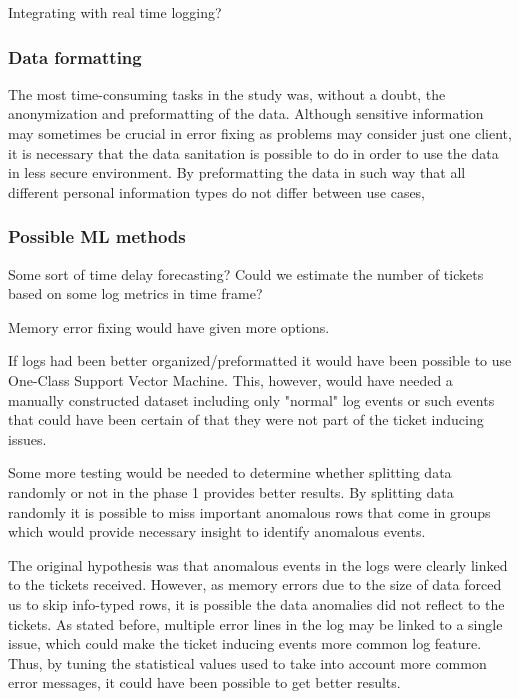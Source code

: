 
Integrating with real time logging?

\subsubsection*{Data formatting}
The most time-consuming tasks in the study was,
without a doubt,
the anonymization and preformatting of the data.
Although sensitive information may sometimes be crucial in error fixing
as problems may consider just one client,
it is necessary that the data sanitation is possible to do
in order to use the data in less secure environment.
By preformatting the data in such way
that all different personal information types
do not differ between use cases, %


\subsubsection*{Possible ML methods}
Some sort of time delay forecasting?\cite{erharter2021pointlessness}
Could we estimate the number of tickets
based on some log metrics in time frame?

Memory error fixing would have given more options.

If logs had been better organized/preformatted
it would have been possible to use One-Class Support Vector Machine.
This, however,
would have needed a manually constructed dataset
including only "normal" log events
or such events that could have been certain of
that they were not part of the ticket inducing issues.


Some more testing would be needed to determine
whether splitting data randomly or not in the phase 1
provides better results.
By splitting data randomly
it is possible to miss important anomalous rows that come in groups
which would provide necessary insight to identify anomalous events.

The original hypothesis was
that anomalous events in the logs
were clearly linked to the tickets received.
However,
as memory errors due to the size of data forced us to skip info-typed rows,
it is possible the data anomalies did not reflect to the tickets.
As stated before,
multiple error lines in the log may be linked to a single issue,
which could make the ticket inducing events
more common log feature.
Thus,
by tuning the statistical values used
to take into account more common error messages,
it could have been possible to get better results.





\clearpage